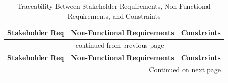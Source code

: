 \documentclass[10pt]{article}
\begin{document}
\begin{longtable}{@{}p{} >{\raggedright\arraybackslash}p{} >{\raggedright\arraybackslash}p{}@{}}

\caption{Traceability Between Stakeholder Requirements, Non-Functional Requirements, and Constraints}
\label{tab:SR2NFRtm}\\
\toprule
\textbf{Stakeholder Req} & \textbf{Non-Functional Requirements} & \textbf{Constraints} \\
\midrule
\endfirsthead

\multicolumn{3}{c}{\tablename\ \thetable{} -- continued from previous page} \\
\toprule
\textbf{Stakeholder Req} & \textbf{Non-Functional Requirements} & \textbf{Constraints} \\
\midrule
\endhead

\midrule
\multicolumn{3}{r}{Continued on next page} \\
\endfoot

\bottomrule
\endlastfoot


\end{longtable}
\end{document}

